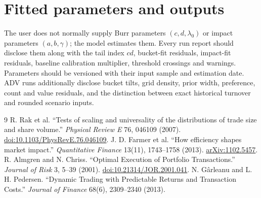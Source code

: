\documentclass[11pt,a4paper]{article}
\numberwithin{equation}{section}
\begin{document}
\section{Fitted parameters and outputs}
The user does not normally supply Burr parameters $(c,d,\lambda_0)$ or impact parameters
$(a,b,\gamma)$; the model estimates them. Every run report should disclose them along with the tail
index $cd$, bucket-fit residuals, impact-fit residuals, baseline calibration multiplier, threshold
crossings and warnings. Parameters should be versioned with their input sample and estimation date. ADV runs additionally disclose bucket tilts, grid density, prior width, preference, count and value residuals, and the distinction between exact historical turnover and rounded scenario inputs.
\normalsize

\begin{thebibliography}{9}\small
{} R. Rak et al. ``Tests of scaling and universality of the distributions of trade
size and share volume.'' \emph{Physical Review E} 76, 046109 (2007).
\href{https://doi.org/10.1103/PhysRevE.76.046109}{doi:10.1103/PhysRevE.76.046109}.
 J. D. Farmer et al. ``How efficiency shapes market impact.''
\emph{Quantitative Finance} 13(11), 1743--1758 (2013).
\href{https://arxiv.org/abs/1102.5457}{arXiv:1102.5457}.
 R. Almgren and N. Chriss. ``Optimal Execution of Portfolio Transactions.''
\emph{Journal of Risk} 3, 5--39 (2001).
\href{https://doi.org/10.21314/JOR.2001.041}{doi:10.21314/JOR.2001.041}.
 N. G\^{a}rleanu and L. H. Pedersen. ``Dynamic Trading with Predictable
Returns and Transaction Costs.'' \emph{Journal of Finance} 68(6), 2309--2340 (2013).
\end{thebibliography}
\end{document}
